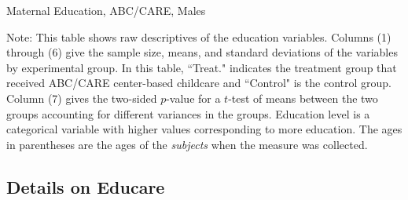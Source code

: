 \begin{table}[H]
\centering
\caption{Maternal Education, ABC/CARE, Males}
\label{tab:meducation-males}
\begin{threeparttable}

\begin{tablenotes}
\item Note: This table shows raw descriptives of the education variables. Columns (1) through (6) give the sample size, means, and standard deviations of the variables by experimental group. In this table, ``Treat." indicates the treatment group that received ABC/CARE center-based childcare and ``Control" is the control group. Column (7) gives the two-sided $p$-value for a $t$-test of means between the two groups accounting for different variances in the groups. Education level is a categorical variable with higher values corresponding to more education. The ages in parentheses are the ages of the \textit{subjects} when the measure was collected.
\end{tablenotes}
\end{threeparttable}
\end{table}


\subsection{Details on Educare}
\label{app:details-educare}

